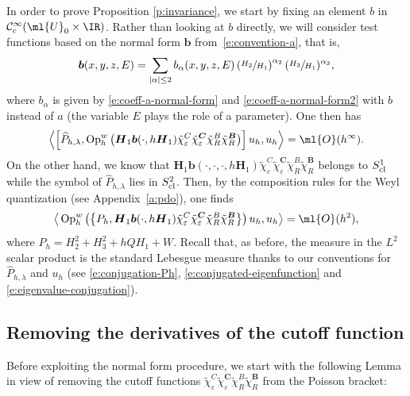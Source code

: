 \documentclass[JEP,XML,SOM,Unicode, NoEqCountersInSection,published]{cedram}
\theoremstyle{plain}
\theoremstyle{definition}
\theoremstyle{remark}
\newcommand{\Op}{\operatorname{Op}}
\begin{document}
In order to prove Proposition \ref{p:invariance}, we start by fixing an element $b$ in $\mathcal{C}^\infty_c(\ml{U}_0 \times \IR)$. Rather than looking at $b$ directly, we will consider test functions based on the normal form $\boldsymbol{b}$ from~\eqref{e:convention-a}, that is,
\begin{equation}
\label{e:normal_form_for_b}
\boldsymbol{b}(x,y,z,E) = \sum_{\vert \alpha \vert \leq 2} b_\alpha(x,y,z,E) \left(\sfrac{H_2}{H_1}\right)^{\alpha_2}(\sfrac{H_3}{H_1})^{\alpha_3},
\end{equation}
where $b_\alpha$ is given by \eqref{e:coeff-a-normal-form} and \eqref{e:coeff-a-normal-form2} with $b$ instead of $a$ (the variable $E$ plays the role of a parameter).
One then has
\[
\left\langle\left[\widehat{P}_{h,\lambda}, \Op_h^w\left(\boldsymbol{H}_1 \boldsymbol{b}(\cdot,h \boldsymbol{H}_1)\tilde{\chi}_\varepsilon^C\tilde{\chi}_\varepsilon^{\boldsymbol{C}}\tilde{\chi}_R^B\tilde{\chi}_R^{\boldsymbol{B}}\right)\right] u_h,u_h\right\rangle=\ml{O}(h^\infty).
\]
On the other hand, we know that $\boldsymbol{H}_1 \boldsymbol{b}(\cdot,\cdot,\cdot,h \boldsymbol{H}_1)\tilde{\chi}_\varepsilon^C\tilde{\chi}_\varepsilon^{\boldsymbol{C}}\tilde{\chi}_R^B\tilde{\chi}_R^{\boldsymbol{B}}$ belongs to $S^1_{\textup{cl}}$ while the symbol of $\widehat{P}_{h,\lambda}$ lies in $S^2_{\textup{cl}}$. Then, by the composition rules for the Weyl quantization (see Appendix~\ref{a:pdo}), one finds
\begin{equation}
\label{e:Wignerequation}
\big \langle\Op_h^w\left(\left\{P_{h},\boldsymbol{H}_1 \boldsymbol{b}(\cdot,h \boldsymbol{H}_1)\tilde{\chi}_\varepsilon^C\tilde{\chi}_\varepsilon^{\boldsymbol{C}}\tilde{\chi}_R^B\tilde{\chi}_R^{\boldsymbol{B}}\right\}\right) u_h,u_h\big\rangle=\ml{O}(h^2),
\end{equation}
where $P_h = H_2^2+H_3^2+hQH_1+W$.
Recall that, as before, the measure in the $L^2$ scalar product is the standard Lebesgue measure thanks to our conventions for $\widehat{P}_{h,\lambda}$ and $u_h$ (see \eqref{e:conjugation-Ph}, \eqref{e:conjugated-eigenfunction} and \eqref{e:eigenvalue-conjugation}).

\subsection{Removing the derivatives of the cutoff function}

Before exploiting the normal form procedure, we start with the following Lemma in view of removing the cutoff functions $\tilde{\chi}_\varepsilon^C\tilde{\chi}_\varepsilon^{\boldsymbol{C}} \tilde{\chi}_R^B\tilde{\chi}_R^{\boldsymbol{B}}$ from the Poisson bracket:
\end{document}
